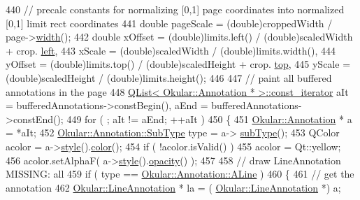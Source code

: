 \begin{DoxyCode}
440             \textcolor{comment}{// precalc constants for normalizing [0,1] page coordinates into normalized [0,1] limit rect
       coordinates}
441             \textcolor{keywordtype}{double} pageScale = (double)croppedWidth / page->\hyperlink{classOkular_1_1Page_a57114e88281da2a51b1bb0d5d4996d53}{width}();
442             \textcolor{keywordtype}{double} xOffset = (double)limits.left() / (double)scaledWidth + crop.
      \hyperlink{classOkular_1_1NormalizedRect_a76336fe9d733f2b559cf8df3ef48f9e7}{left},
443                    xScale = (\textcolor{keywordtype}{double})scaledWidth / (double)limits.width(),
444                    yOffset = (double)limits.top() / (double)scaledHeight + crop.
      \hyperlink{classOkular_1_1NormalizedRect_acfb70f6417c993508d50090b512cb954}{top},
445                    yScale = (\textcolor{keywordtype}{double})scaledHeight / (double)limits.height();
446 
447             \textcolor{comment}{// paint all buffered annotations in the page}
448             \hyperlink{classQList}{QList< Okular::Annotation * >::const\_iterator} aIt 
      = bufferedAnnotations->constBegin(), aEnd = bufferedAnnotations->constEnd();
449             \textcolor{keywordflow}{for} ( ; aIt != aEnd; ++aIt )
450             \{
451                 \hyperlink{classOkular_1_1Annotation}{Okular::Annotation} * a = *aIt;
452                 \hyperlink{classOkular_1_1Annotation_af71b46e37d5f850b97d5c4de3be9aac0}{Okular::Annotation::SubType} type = a->
      \hyperlink{classOkular_1_1Annotation_af9833449767eacd740f377e69a1fdd48}{subType}();
453                 QColor acolor = a->\hyperlink{classOkular_1_1Annotation_ae1f845ddbd6d524b2b388c6c9ef26423}{style}().\hyperlink{classOkular_1_1Annotation_1_1Style_a2c32cb2b41ef8732ddcd3d3dffc20b7d}{color}();
454                 \textcolor{keywordflow}{if} ( !acolor.isValid() )
455                     acolor = Qt::yellow;
456                 acolor.setAlphaF( a->\hyperlink{classOkular_1_1Annotation_ae1f845ddbd6d524b2b388c6c9ef26423}{style}().\hyperlink{classOkular_1_1Annotation_1_1Style_abb17b057d91f128793b3fa3d4b556a45}{opacity}() );
457 
458                 \textcolor{comment}{// draw LineAnnotation MISSING: all}
459                 \textcolor{keywordflow}{if} ( type == \hyperlink{classOkular_1_1Annotation_af71b46e37d5f850b97d5c4de3be9aac0a7035dc978d8b79958f34e3d164838726}{Okular::Annotation::ALine} )
460                 \{
461                     \textcolor{comment}{// get the annotation}
462                     \hyperlink{classOkular_1_1LineAnnotation}{Okular::LineAnnotation} * la = (
      \hyperlink{classOkular_1_1LineAnnotation}{Okular::LineAnnotation} *) a;

\end{DoxyCode}
